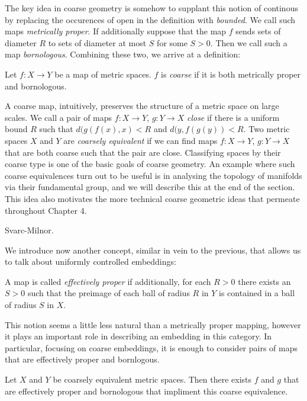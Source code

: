 The key idea in coarse geometry is somehow to supplant this notion of continous by replacing the occurences of open in the definition with \textit{bounded}. We call such maps \textit{metrically proper}. If additionally suppose that the map $f$ sends sets of diameter $R$ to sets of diameter at most $S$ for some $S>0$. Then we call such a map \textit{bornologous}. Combining these two, we arrive at a definition:

\begin{definition}
Let $f:X \rightarrow Y$ be a map of metric spaces. $f$ is \textit{coarse} if it is both metrically proper and bornologous.
\end{definition}

A coarse map, intuitively, preserves the structure of a metric space on large scales. We call a pair of maps $f:X\rightarrow Y$, $g:Y\rightarrow X$ \textit{close} if there is a uniform bound $R$ such that $d(g(f(x),x)<R$ and $d(y,f(g(y))<R$. Two metric spaces $X$ and $Y$ are \textit{coarsely equivalent} if we can find maps $f:X\rightarrow Y$, $g:Y\rightarrow X$ that are both coarse such that the pair are close.  Classifying spaces by their coarse type is one of the basic goals of coarse geometry. An example where such coarse equivalences turn out to be useful is in analysing the topology of manifolds via their fundamental group, and we will describe this at the end of the section. This idea also motivates the more technical coarse geometric ideas that permeate throughout Chapter 4.

\begin{lemma}
Svarc-Milnor.
\end{lemma}

We introduce now another concept, similar in vein to the previous, that allows us to talk about uniformly controlled embeddings:

\begin{definition}
A map is called \textit{effectively proper} if additionally, for each $R>0$ there exists an $S>0$ such that the preimage of each ball of radius $R$ in $Y$ is contained in a ball of radius $S$ in $X$.
\end{definition}

This notion seems a little less natural than a metrically proper mapping, however it plays an important role in describing an embedding in this category. In particular, focusing on coarse embeddings, it is enough to consider pairs of maps that are effectively proper and bornlogous.

\begin{lemma}
Let $X$ and $Y$ be coarsely equivalent metric spaces. Then there exists $f$ and $g$ that are effectively proper and bornologous that impliment this coarse equivalence.
\end{lemma}

